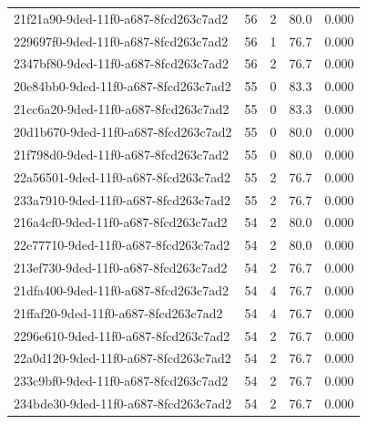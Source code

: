\begin{longtable}{l r r r r}
21f21a90-9ded-11f0-a687-8fcd263c7ad2 & 56 & 2 & 80.0 & 0.000 \\

229697f0-9ded-11f0-a687-8fcd263c7ad2 & 56 & 1 & 76.7 & 0.000 \\

2347bf80-9ded-11f0-a687-8fcd263c7ad2 & 56 & 2 & 76.7 & 0.000 \\

20e84bb0-9ded-11f0-a687-8fcd263c7ad2 & 55 & 0 & 83.3 & 0.000 \\

21cc6a20-9ded-11f0-a687-8fcd263c7ad2 & 55 & 0 & 83.3 & 0.000 \\

20d1b670-9ded-11f0-a687-8fcd263c7ad2 & 55 & 0 & 80.0 & 0.000 \\

21f798d0-9ded-11f0-a687-8fcd263c7ad2 & 55 & 0 & 80.0 & 0.000 \\

22a56501-9ded-11f0-a687-8fcd263c7ad2 & 55 & 2 & 76.7 & 0.000 \\

233a7910-9ded-11f0-a687-8fcd263c7ad2 & 55 & 2 & 76.7 & 0.000 \\

216a4cf0-9ded-11f0-a687-8fcd263c7ad2 & 54 & 2 & 80.0 & 0.000 \\

22e77710-9ded-11f0-a687-8fcd263c7ad2 & 54 & 2 & 80.0 & 0.000 \\

213ef730-9ded-11f0-a687-8fcd263c7ad2 & 54 & 2 & 76.7 & 0.000 \\

21dfa400-9ded-11f0-a687-8fcd263c7ad2 & 54 & 4 & 76.7 & 0.000 \\

21ffaf20-9ded-11f0-a687-8fcd263c7ad2 & 54 & 4 & 76.7 & 0.000 \\

2296e610-9ded-11f0-a687-8fcd263c7ad2 & 54 & 2 & 76.7 & 0.000 \\

22a0d120-9ded-11f0-a687-8fcd263c7ad2 & 54 & 2 & 76.7 & 0.000 \\

233c9bf0-9ded-11f0-a687-8fcd263c7ad2 & 54 & 2 & 76.7 & 0.000 \\

234bde30-9ded-11f0-a687-8fcd263c7ad2 & 54 & 2 & 76.7 & 0.000 \\


\end{longtable}
